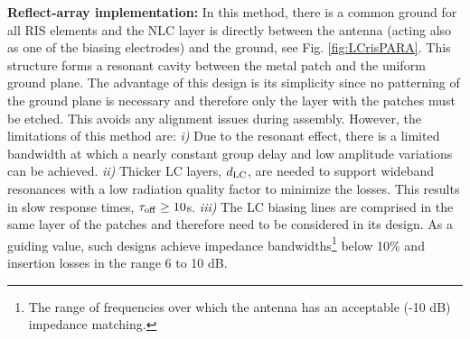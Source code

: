 \textbf{Reflect-array implementation:} In this method, there is a common ground for all \gls{RIS} elements and the \gls{NLC} layer is directly between the antenna (acting also as one of the biasing electrodes) and the ground, see Fig. \ref{fig:LCrisPARA}. This structure forms a resonant cavity between the metal patch and the uniform ground plane. The advantage of this design is its simplicity since no patterning of the ground plane is necessary and therefore only the layer with the patches must be etched. This avoids any alignment issues during assembly. However, the limitations of this method are: \textit{i)} 
Due to the resonant effect, there is a limited bandwidth at which a nearly constant group delay and low amplitude
variations can be achieved. 
\textit{ii)} Thicker LC layers, $d_{\rm LC}$, are needed to support wideband
resonances with a low radiation quality factor to minimize
the losses. This results in slow response times, {$\tau_{\rm off}\geq 10$s}.
\textit{iii)} The LC biasing lines are comprised in the same layer of the patches and therefore need to be considered in its design.
As a guiding value, such designs achieve impedance bandwidths\footnote{The range of frequencies over which the antenna has an acceptable (-10 dB) impedance matching.} below 10\% and insertion losses in the range 6 to 10 dB.

